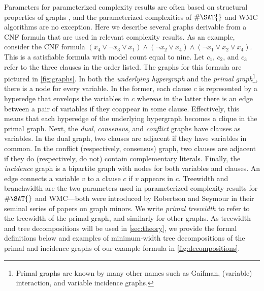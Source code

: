 \documentclass{article}
\theoremstyle{definition}
\theoremstyle{remark}
\begin{document}
Parameters for parameterized complexity results are often based on structural
properties of graphs \cite{DBLP:series/txcs/DowneyF13}, and the parameterized
complexities of $\#\SAT{}$ and \textsf{WMC} algorithms are no exception. Here we
describe several graphs derivable from a CNF formula that are used in relevant
complexity results. As an example, consider the CNF formula $(x_4 \lor \neg x_3
\lor x_1) \land (\neg x_2 \lor x_4) \land (\neg x_1 \lor x_2 \lor x_4)$. This is
a satisfiable formula with model count equal to nine. Let $c_1$, $c_2$, and
$c_3$ refer to the three clauses in the order listed. The graphs for this
formula are pictured in \cref{fig:graphs}. In both the \emph{underlying
  hypergraph} and the \emph{primal graph}\footnote{Primal graphs are known by
  many other names such as Gaifman, (variable) interaction, and variable
  incidence graphs.}, there is a node for every variable. In the former, each
clause $c$ is represented by a hyperedge that envelops the variables in $c$
whereas in the latter there is an edge between a pair of variables if they
coappear in some clause. Effectively, this means that each hyperedge of the
underlying hypergraph becomes a clique in the primal graph. Next, the
\emph{dual}, \emph{consensus}, and \emph{conflict} graphs have clauses as
variables. In the dual graph, two clauses are adjacent if they have variables in
common. In the conflict (respectively, consensus) graph, two clauses are
adjacent if they do (respectively, do not) contain complementary literals.
Finally, the \emph{incidence} graph is a bipartite graph with nodes for both
variables and clauses. An edge connects a variable $v$ to a clause $c$ if $v$
appears in $c$. Treewidth \cite{DBLP:journals/jct/RobertsonS84} and branchwidth
\cite{DBLP:journals/jct/RobertsonS91} are the two parameters used in
parameterized complexity results for $\#\SAT{}$ and \textsf{WMC}---both were
introduced by Robertson and Seymour in their seminal series of papers on graph
minors. We write \emph{primal treewidth} to refer to the treewidth of the primal
graph, and similarly for other graphs. As treewidth and tree decompositions will
be used in \cref{sec:theory}, we provide the formal definitions below and
examples of minimum-width tree decompositions of the primal and incidence graphs
of our example formula in \cref{fig:decompositions}.
\end{document}

